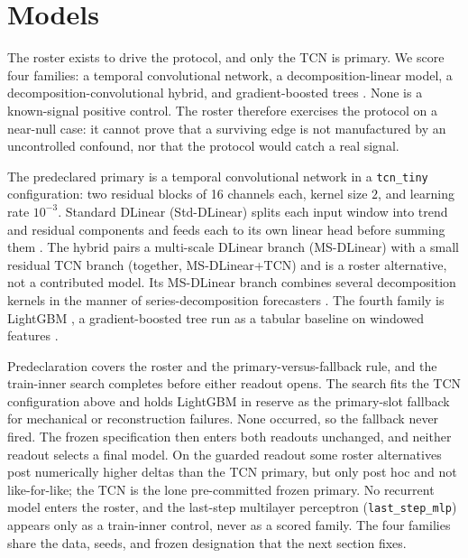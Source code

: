 \section{Models}

The roster exists to drive the protocol, and only the TCN is primary. We score
four families: a temporal convolutional network, a decomposition-linear model, a
decomposition-convolutional hybrid, and gradient-boosted trees
\cite{bai2018empirical,zeng2023dlinear,ke2017lightgbm,grinsztajn2022tree}. None
is a known-signal positive control. The roster therefore exercises the protocol on
a near-null case: it cannot prove that a surviving edge is not manufactured by an
uncontrolled confound, nor that the protocol would catch a real signal.

The predeclared primary is a temporal convolutional network
\cite{bai2018empirical} in a \texttt{tcn\_tiny} configuration: two residual
blocks of 16 channels each, kernel size \(2\), and learning rate \(10^{-3}\).
Standard DLinear (Std-DLinear) splits each input window into trend and residual
components and feeds each to its own linear head before summing them
\cite{zeng2023dlinear}. The hybrid pairs a multi-scale DLinear branch
(MS-DLinear) with a small residual TCN branch (together, MS-DLinear+TCN) and is
a roster alternative, not a contributed model. Its MS-DLinear branch combines
several decomposition kernels in the manner of series-decomposition forecasters
\cite{wu2021autoformer,zhou2022fedformer}. The fourth family is LightGBM
\cite{ke2017lightgbm}, a gradient-boosted tree run as a tabular baseline on
windowed features \cite{grinsztajn2022tree}.

Predeclaration covers the roster and the primary-versus-fallback rule, and the
train-inner search completes before either readout opens. The search fits the TCN
configuration above and holds LightGBM in reserve as the primary-slot fallback
for mechanical or reconstruction failures. None occurred,
so the fallback never fired. The frozen specification then enters both readouts
unchanged, and neither readout selects a final model. On the guarded readout
some roster alternatives post numerically higher deltas than the TCN
primary, but only post hoc and not like-for-like; the TCN is the lone
pre-committed frozen primary. No recurrent model enters the roster, and the
last-step multilayer perceptron (\texttt{last\_step\_mlp}) appears only as a
train-inner control, never as a scored family. The four families share the data,
seeds, and frozen designation that the next section fixes.
